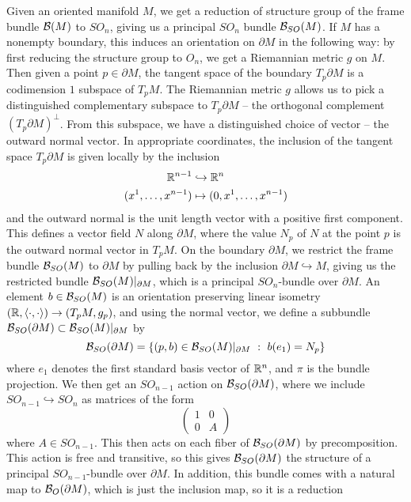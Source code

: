 %
Given an oriented manifold $M$, we get a reduction of structure group
of the frame bundle $\mathcal{B}(M)$ to $SO_n$, giving us a principal $SO_n$ bundle
$\mathcal{B}_{SO}(M)$. If $M$ has a nonempty boundary, this induces an orientation on
$\partial M$ in the following way: by first reducing the structure group to $O_n$,
we get a Riemannian metric $g$ on $M$. Then given a point $p \in \partial M$,
the tangent space of the boundary $T_p\partial M$ is a codimension $1$ subspace
of $T_pM$. The Riemannian metric $g$ allows us to pick a distinguished complementary
subspace to $T_p\partial M$ -- the orthogonal complement $(T_p \partial M)^\perp$.
From this subspace, we have a distinguished choice of vector -- the outward
normal vector. In appropriate coordinates, the inclusion of the tangent space
$T_p\partial M$ is given locally by the inclusion
%
\begin{align*}
\mathbb{R}^{n-1} &\hookrightarrow \mathbb{R}^n \\
(x^1, \ldots, x^{n-1}) &\mapsto (0, x^1, \ldots, x^{n-1})
\end{align*}
%
and the outward normal is the unit length vector with a positive first component.
This defines a vector field $N$ along $\partial M$, where the value $N_p$
of $N$ at the point $p$ is the outward normal vector in $T_pM$.
On the boundary $\partial M$, we restrict the frame bundle $\mathcal{B}_{SO}(M)$
to $\partial M$ by pulling back by the inclusion $\partial M \hookrightarrow M$,
giving us the restricted bundle $\mathcal{B}_{SO}(M)\vert_{\partial M}$, which is a principal
$SO_n$-bundle over $\partial M$. An element $b \in \mathcal{B}_{SO}(M)$ is an orientation
preserving linear isometry $(\mathbb{R}, \langle \cdot,\cdot\rangle) \to (T_pM, g_p)$, and
using the normal vector, we define a subbundle
$\mathcal{B}_{SO}(\partial M) \subset \mathcal{B}_{SO}(M)\vert_{\partial M}$ by
\[
\mathcal{B}_{SO}(\partial M) = \left\lbrace (p,b) \in \mathcal{B}_{SO}(M)\vert_{\partial M} ~:~
b(e_1) = N_p \right\rbrace
\]
where $e_1$ denotes the first standard basis vector of $\mathbb{R}^n$, and $\pi$ is
the bundle projection. We then get an $SO_{n-1}$ action on $\mathcal{B}_{SO}(\partial M)$,
where we include $SO_{n-1} \hookrightarrow SO_n$ as matrices of the form
\[
\begin{pmatrix}
1 & 0 \\
0 & A
\end{pmatrix}
\]
where $A \in SO_{n-1}$. This then acts on each fiber of $\mathcal{B}_{SO}(\partial M)$
by precomposition. This action is free and transitive, so this gives
$\mathcal{B}_{SO}(\partial M)$ the structure of a principal $SO_{n-1}$-bundle over
$\partial M$. In addition, this bundle comes with a natural map to
$\mathcal{B}_O(\partial M)$, which is just the inclusion map, so it is a reduction
